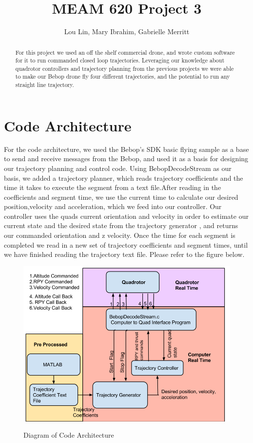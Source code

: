 \documentclass[english, twocolumn]{article}
\title{MEAM 620 Project 3}
\author{Lou Lin, Mary Ibrahim, Gabrielle Merritt}
\begin{document}
\maketitle

\begin{abstract}
For this project we used an off the shelf commercial drone, and wrote custom software for it to run commanded closed loop trajectories. Leveraging our knowledge about quadrotor controllers and trajectory planning from the previous projects we were able to make our Bebop drone fly four different trajectories, and the potential to run any straight line trajectory. 
\end{abstract}
\section*{Code Architecture }
For the code architecture, we used the Bebop's SDK basic flying sample as a base to send and receive messages from the Bebop, and used it as a basis for designing our trajectory planning and control code. Using BebopDecodeStream as our basis, we added a trajectory planner, which reads trajectory coefficients and the time it takes to execute the segment  from a text file.After reading in the coefficients and segment time, we use the current time to calculate our desired position,velocity and acceleration, which we feed into our controller. Our controller uses the quads current orientation and velocity in order to estimate our current state and the desired state from the trajectory generator , and returns our commanded orientation and z velocity. Once the time for each segment is completed we read in a new set of trajectory coefficients and segment times, until we have finished reading the trajectory text file. Please refer to the figure below.
\begin{figure}[h!] 
\includegraphics[width = \linewidth]{software.png}
\label{fig:code_draw}
\caption{Diagram of Code Architecture}
\end{figure}
\FloatBarrier 
\end{document}
